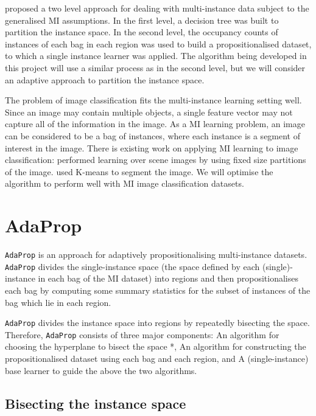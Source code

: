 \documentclass[a4paper,12pt]{article} %
\newcommand{\AdaProp}{\texttt{AdaProp}\xspace}
\begin{document}
 proposed a two level approach for dealing with multi-instance data subject to the generalised MI assumptions. In the first level, a decision tree was built to partition the instance space. In the second level, the occupancy counts of instances of each bag in each region was used to build a propositionalised dataset, to which a single instance learner was applied.
The algorithm being developed in this project will use a similar process as  in the second level, but we will consider an adaptive approach to partition the instance space.

The problem of image classification fits the multi-instance learning setting well. Since an image may contain multiple objects, a single feature vector may not capture all of the information in the image. As a MI learning problem, an image can be considered to be a bag of instances, where each instance is a segment of interest in the image. There is existing work on applying MI learning to image classification:  performed learning over scene images by using fixed size partitions of the image.  used K-means to segment the image. We will optimise the algorithm to perform well with MI image classification datasets.


\section{AdaProp}

\AdaProp is an approach for adaptively propositionalising multi-instance datasets.
\AdaProp divides the single-instance space
    (the space defined by each (single)-instance in each bag of the MI dataset)
    into regions and then
    propositionalises each bag by computing some summary statistics for the 
    subset of instances of the bag which lie in each region.

\AdaProp divides the instance space into regions
    by repeatedly bisecting the space.
Therefore, \AdaProp consists of three major components: 
    An algorithm for choosing the hyperplane to bisect the space *,
    An algorithm for constructing the propositionalised dataset 
        using each bag and each region, and
    A (single-instance) base learner to guide the above the two algorithms.

\subsection{Bisecting the instance space}
\end{document}
